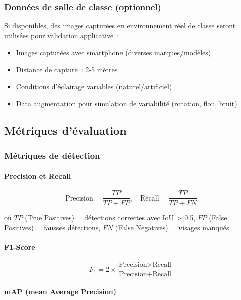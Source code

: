 \begin{onehalfspace}
\subsubsection{Données de salle de classe (optionnel)}

\hspace{0.65 cm}Si disponibles, des images capturées en environnement réel de classe seront utilisées pour validation applicative~:

\begin{itemize}
\item Images capturées avec smartphone (diverses marques/modèles)
\item Distance de capture~: 2-5 mètres
\item Conditions d'éclairage variables (naturel/artificiel)
\item Data augmentation pour simulation de variabilité (rotation, flou, bruit)
\end{itemize}

\subsection{Métriques d'évaluation}

\subsubsection{Métriques de détection}

\paragraph{Precision et Recall}

\[
\text{Precision} = \frac{TP}{TP + FP}, \quad \text{Recall} = \frac{TP}{TP + FN}
\]

où $TP$ (True Positives) = détections correctes avec IoU > 0.5, $FP$ (False Positives) = fausses détections, $FN$ (False Negatives) = visages manqués.

\paragraph{F1-Score}

\[
F_1 = 2 \times \frac{\text{Precision} \times \text{Recall}}{\text{Precision} + \text{Recall}}
\]

\paragraph{mAP (mean Average Precision)}


\end{onehalfspace}
